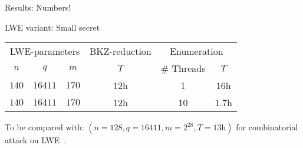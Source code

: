 \begin{frame}{Results: Numbers!}
{\begin{block}{LWE variant: Small secret}
\begin{table}[t!]
\begin{tabular}{ccc|c|cc}
                    \multicolumn{3}{c|}{LWE-parameters} & {BKZ-reduction}  & \multicolumn{2}{c}{Enumeration} \\
                    $n$   & $q$     & $m$     & $T$             & \# Threads & $T$      \\ \midrule
                    $140$ & $16411$     & $170$     & $12$h             & 1 & $16$h  \\
                    $140$ & $16411$     & $170$     & $12$h             & 10 & $1.7$h  \\
                \end{tabular}
            \end{table}
        \end{block}
        \vfill{}
        To be compared with: $(n=128, q=16411, m =2^{28}, T=13\text{h} )$ for combinatorial attack on LWE~\cite{BKW}.
    }
\end{frame}

